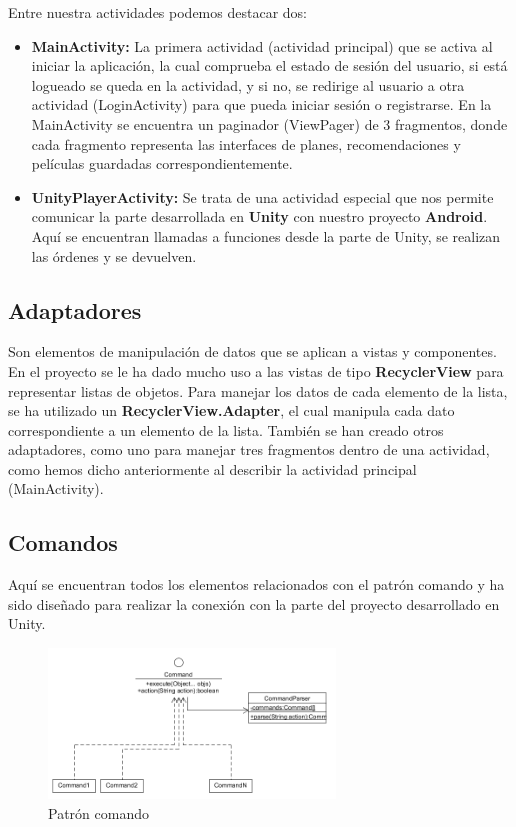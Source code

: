 Entre nuestra actividades podemos destacar dos: 
\begin{itemize}
    \item \textbf{MainActivity:} La primera actividad (actividad principal) que se activa al iniciar la aplicación, la cual comprueba el estado de sesión del usuario, si está logueado se queda en la actividad, y si no, se redirige al usuario a otra actividad (LoginActivity) para que pueda iniciar sesión o registrarse. En la MainActivity se encuentra un paginador (ViewPager) de 3 fragmentos, donde cada fragmento representa las interfaces de planes, recomendaciones y películas guardadas correspondientemente.
    \item \textbf{UnityPlayerActivity:} Se trata de una actividad especial que nos permite comunicar la parte desarrollada en \textbf{Unity} con nuestro proyecto \textbf{Android}. Aquí se encuentran llamadas a funciones desde la parte de Unity, se realizan las órdenes y se devuelven.
\end{itemize} 

\subsection{Adaptadores}
\label{makereference4.3.2} 
Son elementos de manipulación de datos que se aplican a vistas y componentes. En el proyecto se le ha dado mucho uso a las vistas de tipo \textbf{RecyclerView} para representar listas de objetos. Para manejar los datos de cada elemento de la lista, se ha utilizado un \textbf{RecyclerView.Adapter}, el cual manipula cada dato correspondiente a un elemento de la lista. También se han creado otros adaptadores, como uno para manejar tres fragmentos dentro de una actividad, como hemos dicho anteriormente al describir la actividad principal (MainActivity).

\subsection{Comandos}
\label{makereference4.3.3}
Aquí se encuentran todos los elementos relacionados con el patrón comando y ha sido diseñado para realizar la conexión con la parte del proyecto desarrollado en Unity.

\begin{figure}[H]
    \centering
    \includegraphics[width=3in]{figures/chapter-4/command_pattern.png}
    \caption{Patrón comando}
\end{figure}


